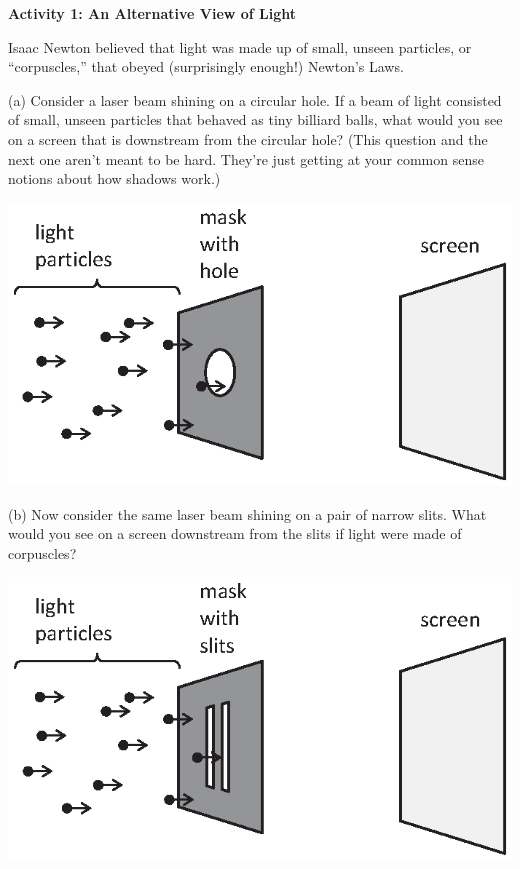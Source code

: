 \medskip
\textbf{Activity 1: An Alternative View of Light}

Isaac Newton believed that light was made up of small, unseen particles, or ``corpuscles,''
that obeyed (surprisingly enough!) Newton's Laws. 


(a) Consider a laser beam shining on a circular hole. If a beam of
light consisted of small, unseen particles that behaved as tiny billiard
balls, what would you see on a screen that is downstream from the circular
hole?  (This question and the next one aren't meant to be hard.
They're just getting at your common sense notions about how shadows work.)

{\centering \includegraphics[scale=0.85]{interference_of_light/circular_hole.eps} \par}


(b) Now consider the same laser beam shining on a pair of narrow slits.
What would you see on a screen downstream from the slits if light
were made of corpuscles?

{\centering \includegraphics[scale=0.85]{interference_of_light/particles_two_slits.eps} \par}

